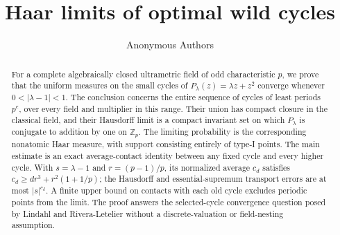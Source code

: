 \documentclass[11pt]{article}
\title{Haar limits of optimal wild cycles}
\author{Anonymous Authors}
\date{}
\theoremstyle{definition}
\theoremstyle{remark}
\numberwithin{equation}{section}
\begin{document}
\maketitle
\begin{abstract}
For a complete algebraically closed ultrametric field of odd characteristic
$p$, we prove that the uniform measures on the small cycles of
$P_\lambda(z)=\lambda z+z^2$ converge whenever $0<|\lambda-1|<1$.
The conclusion concerns the entire sequence of cycles of least periods
$p^e$, over every field and multiplier in this range. Their union has
compact closure in the classical field, and their Hausdorff limit is a
compact invariant set on which $P_\lambda$ is conjugate to addition by
one on $\mathbb Z_p$. The limiting probability is the corresponding
nonatomic Haar measure, with support consisting entirely of type-I
points. The main estimate is an exact average-contact identity between
any fixed cycle and every higher cycle. With $s=\lambda-1$ and
$r=(p-1)/p$, its normalized average $c_d$ satisfies
$c_d\ge d r^3+r^2(1+1/p)$; the Hausdorff and essential-supremum
transport errors are at most $|s|^{c_d}$. A finite upper bound on
contacts with each old cycle excludes periodic points from the limit.
The proof answers the selected-cycle convergence question posed by
Lindahl and Rivera-Letelier without a discrete-valuation or field-nesting
assumption.
\end{abstract}









\end{document}

